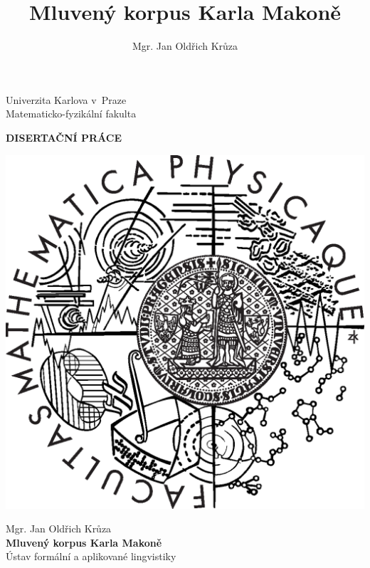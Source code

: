 \documentclass[12pt,notitlepage]{report}
\title{Mluven\'{y} korpus Karla Makon\v{e}}   %
\author{Mgr. Jan Oldřich Krůza} %
\begin{document}


\begin{titlepage}
\begin{center}

\vspace{15mm}

\large
Univerzita Karlova v~Praze\\
Matematicko-fyzikální fakulta\\

\vspace{5mm}

{\Large\bf DISERTAČNÍ PRÁCE}

\vspace{25mm}

\includegraphics[scale=0.5]{rc/mff-logo.eps} 

\vspace{25mm}


Mgr. Jan Oldřich Krůza\\
\vspace{5mm}
{\Large\bf Mluven\'{y} korpus Karla Makon\v{e}}\\
\vspace{5mm}
Ústav formální a aplikované lingvistiky\\
\end{center}
\vspace{10mm}


\end{titlepage}
\end{document}
